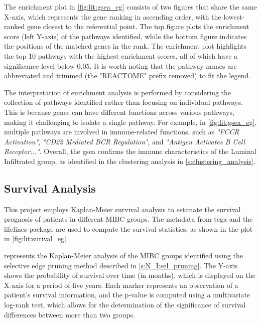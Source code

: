 The enrichment plot in \cref{fig:lit:gsea_eg} consists of two figures that share the same X-axis, which represents the gene ranking in ascending order, with the lowest-ranked gene closest to the referential point. The top figure plots the enrichment score (left Y-axis) of the pathways identified, while the bottom figure indicates the positions of the matched genes in the rank. The enrichment plot highlights the top 10 pathways with the highest enrichment scores, all of which have a significance level below 0.05. It is worth noting that the pathway names are abbreviated and trimmed (the "REACTOME" prefix removed) to fit the legend.

The interpretation of enrichment analysis is performed by considering the collection of pathways identified rather than focusing on individual pathways. This is because genes can have different functions across various pathways, making it challenging to isolate a single pathway. For example, in \cref{fig:lit:gsea_eg}, multiple pathways are involved in immune-related functions, such as \textit{"FCCR Activation"}, \textit{"CD22 Mediated BCR Regulation"}, and \textit{"Antigen Activates B Cell Receptor..."}. Overall, the \acrshort{gsea} confirms the immune characteristics of the Luminal Infiltrated group, as identified in the clustering analysis in \cref{s:clustering_analysis}.

\subsection{Survival Analysis} \label{s:lit:survival}

This project employs Kaplan-Meier survival analysis \citep{Kaplan1958-iy} to estimate the survival prognosis of patients in different MIBC groups. The metadata from \acrlong{tcga} and the lifelines package \citet{Davidson-Pilon2019-fu} are used to compute the survival statistics, as shown in the plot in \cref{fig:lit:surival_eg}.

 represents the Kaplan-Meier analysis of the MIBC groups identified using the selective edge pruning method described in \cref{s:N_I:sel_pruning}. The Y-axis shows the probability of survival over time (in months), which is displayed on the X-axis for a period of five years. Each marker represents an observation of a patient's survival information, and the p-value is computed using a multivariate log-rank test, which allows for the determination of the significance of survival differences between more than two groups.

